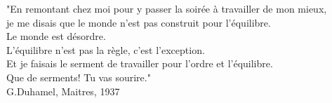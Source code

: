 "En remontant chez moi pour y passer la soirée à travailler de mon mieux, \\
je me disais que le monde n'est pas construit pour l'équilibre.\\
Le monde est désordre. \\
 L'équilibre n'est pas la règle, c'est l'exception.\\
 Et je faisais le serment de travailler pour l'ordre et l’équilibre. \\
Que de serments! Tu vas sourire." \\
G.Duhamel, Maitres, 1937 \nocite{duhamel1937maitres}
